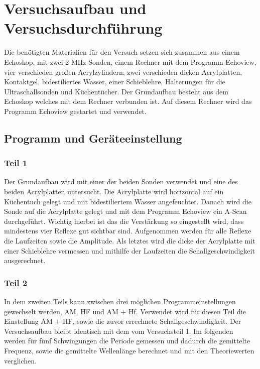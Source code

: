 \section{Versuchsaufbau und Versuchsdurchführung}

\begin{flushleft}
    Die benötigten Materialien für den Versuch setzen sich zusammen aus einem Echoskop, mit zwei 2 MHz Sonden, einem Rechner mit dem Programm Echoview, vier verschieden großen Acrylzylindern, zwei verschieden dicken Acrylplatten, Kontaktgel, bidestiliertes Wasser, einer Schieblehre, Halterungen für die Ultraschallsonden und Küchentücher. 
    Der Grundaufbau besteht aus dem Echoskop welches mit dem Rechner verbunden ist. 
    Auf diesem Rechner wird das Programm Echoview gestartet und verwendet. 
\end{flushleft}

\subsection{Programm und Geräteeinstellung}

\subsubsection{Teil 1}

\begin{flushleft}
    Der Grundaufbau wird mit einer der beiden Sonden verwendet und eine des beiden Acrylplatten untersucht.
    Die Acrylplatte wird horizontal auf ein Küchentuch gelegt und mit bidestiliertem Wasser angefeuchtet. 
    Danach wird die Sonde auf die Acrylplatte gelegt und mit dem Programm Echoview ein A-Scan durchgeführt.
    Wichtig hierbei ist das die Verstärkung so eingestellt wird, dass mindestens vier Reflexe gut sichtbar sind.
    Aufgenommen werden für alle Reflexe die Laufzeiten sowie die Amplitude.
    Als letztes wird die dicke der Acrylplatte mit einer Schieblehre vermessen und mithilfe der Laufzeiten die Schallgeschwindigkeit ausgerechnet.
\end{flushleft}

\subsubsection{Teil 2}

\begin{flushleft}
    In dem zweiten Teils kann zwischen drei möglichen Programmeinstellungen gewechselt werden, AM, HF und AM + Hf.
    Verwendet wird für diesen Teil die Einstellung AM + HF, sowie die zuvor errechnete Schallgeschwindigkeit.
    Der Versuchsaufbau bleibt identisch mit dem vom Versuchsteil 1. 
    Im folgenden werden für fünf Schwingungen die Periode gemessen und dadurch die gemittelte Frequenz, sowie die gemittelte Wellenlänge berechnet und mit den Theoriewerten verglichen.
\end{flushleft}

